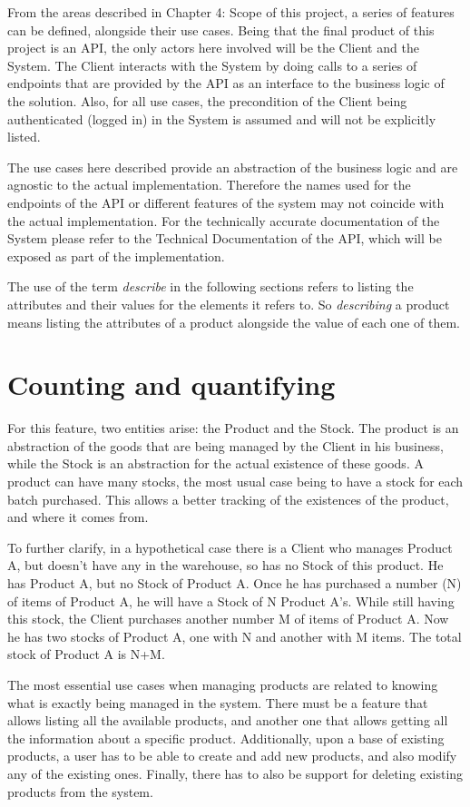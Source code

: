 From the areas described in Chapter 4: Scope of this project, a series of features can be defined, alongside their use cases. Being that the final product of this project is an API, the only actors here involved will be the Client and the System. The Client interacts with the System by doing calls to a series of endpoints that are provided by the API as an interface to the business logic of the solution. Also, for all use cases, the precondition of the Client being authenticated (logged in) in the System is assumed and will not be explicitly listed.

The use cases here described provide an abstraction of the business logic and are agnostic to the actual implementation. Therefore the names used for the endpoints of the API or different features of the system may not coincide with the actual implementation. For the technically accurate documentation of the System please refer to the Technical Documentation of the API, which will be exposed as part of the implementation.

The use of the term \textit{describe} in the following sections refers to listing the attributes and their values for the elements it refers to. So \textit{describing} a product means listing the attributes of a product alongside the value of each one of them.

\section{Counting and quantifying}
For this feature, two entities arise: the Product and the Stock. The product is an abstraction of the goods that are being managed by the Client in his business, while the Stock is an abstraction for the actual existence of these goods. A product can have many stocks, the most usual case being to have a stock for each batch purchased. This allows a better tracking of the existences of the product, and where it comes from.

To further clarify, in a hypothetical case there is a Client who manages Product A, but doesn’t have any in the warehouse, so has no Stock of this product. He has Product A, but no Stock of Product A. Once he has purchased a number (N) of items of Product A, he will have a Stock of N Product A’s. While still having this stock, the Client purchases another number M of items of Product A. Now he has two stocks of Product A, one with N and another with M items. The total stock of Product A is N+M.

The most essential use cases when managing products are related to knowing what is exactly being managed in the system. There must be a feature that allows listing all the available products, and another one that allows getting all the information about a specific product. Additionally, upon a base of existing products, a user has to be able to create and add new products, and also modify any of the existing ones. Finally, there has to also be support for deleting existing products from the system.

